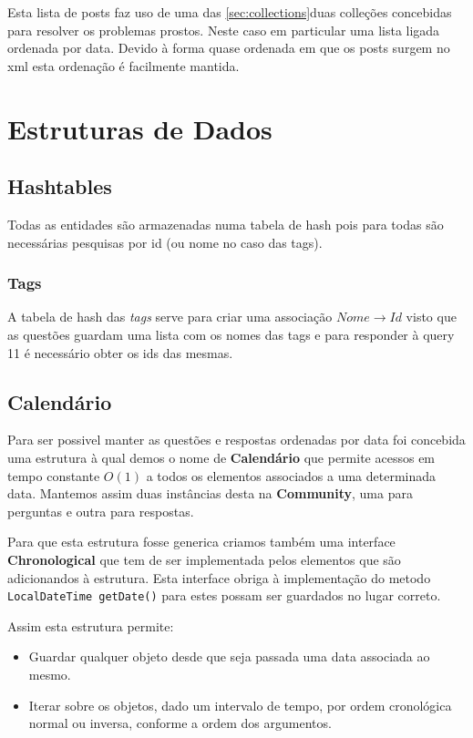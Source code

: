 \documentclass[10pt,a4paper]{report}
\begin{document}
    Esta lista de posts faz uso de uma das \ref{sec:collections}{duas colleções}
    concebidas para resolver os problemas prostos. Neste caso em particular uma
    lista ligada ordenada por data. Devido à forma quase ordenada em que os
    posts surgem no xml esta ordenação é facilmente mantida.


\chapter{Estruturas de Dados}
    \section{Hashtables}
        Todas as entidades são armazenadas numa tabela de hash pois para todas
        são necessárias pesquisas por id (ou nome no caso das tags).

        \subsection{Tags}
        A tabela de hash das \textit{tags} serve para criar uma associação
        $Nome \to Id$ visto que as questões guardam uma lista com os nomes das
        tags e para responder à query 11 é necessário obter os ids das mesmas.

    \section{Calendário}
        Para ser possivel manter as questões e respostas ordenadas por data foi
        concebida uma estrutura à qual demos o nome de \textbf{Calendário} que
        permite acessos em tempo constante $O(1)$ a todos os elementos
        associados a uma determinada data. Mantemos assim duas instâncias desta
        na \textbf{Community}, uma para perguntas e outra para respostas.

        Para que esta estrutura fosse generica criamos também uma interface
        \textbf{Chronological} que tem de ser implementada pelos elementos
        que são adicionandos à estrutura. Esta interface obriga à implementação
        do metodo \texttt{LocalDateTime getDate()} para estes possam
        ser guardados no lugar correto.

        Assim esta estrutura permite:
        \begin{itemize}
                \item Guardar qualquer objeto desde que seja
                      passada uma data associada ao mesmo.
                \item Iterar sobre os objetos, dado um intervalo de tempo,
                      por ordem cronológica normal ou inversa, conforme a
                      ordem dos argumentos.
        \end{itemize}
\end{document}

